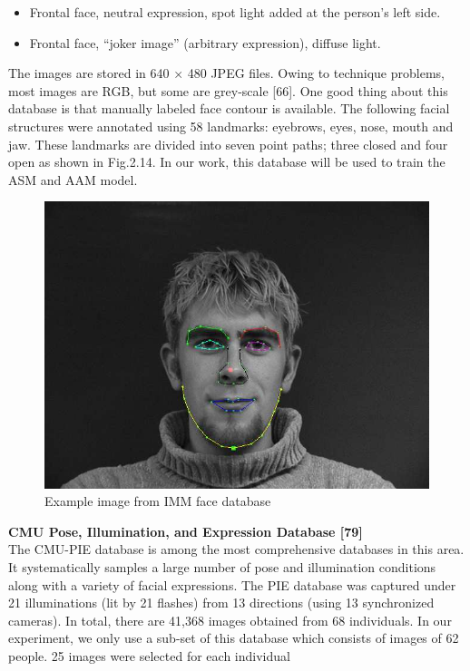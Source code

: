\documentclass[12pt, twoside]{report}
\begin{document}
	\newpage
	
	\begin{itemize}
		\item Frontal face, neutral expression, spot light added at the person’s left side.
		\item Frontal face, “joker image” (arbitrary expression), diffuse light.
	\end{itemize}
	\qquad The images are stored in 640 × 480 JPEG files. Owing to technique problems, most images are RGB, but some are grey-scale [66]. One good thing about this database is that manually labeled face contour is available. The following facial structures were annotated using 58 landmarks: eyebrows, eyes, nose, mouth and jaw. These landmarks are divided into seven point paths; three closed and four open as shown in Fig.2.14. In our work, this database will be used to train the ASM and AAM model.
	
	\begin{figure}[h]
		\centering
		\includegraphics[scale=0.5]{img/98_1.png}
		\caption{Example image from IMM face database}
	\end{figure}
	\vspace{0.5cm}
	\noindent \textbf{CMU Pose, Illumination, and Expression Database [79]} \vspace{0.3cm} \\
	The CMU-PIE database is among the most comprehensive databases in this area. It systematically samples a large number of pose and illumination conditions along with a variety of facial expressions. The PIE database was captured under 21 illuminations (lit by 21 flashes) from 13 directions (using 13 synchronized cameras). In total, there are 41,368 images obtained from 68 individuals. In our experiment, we only use a sub-set of this database which consists of images of 62 people. 25 images were selected for each individual
	
\end{document}
